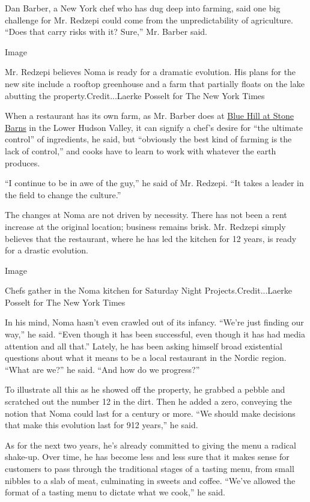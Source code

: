 Dan Barber, a New York chef who has dug deep into farming, said one big
challenge for Mr. Redzepi could come from the unpredictability of
agriculture. ``Does that carry risks with it? Sure,'' Mr. Barber said.

Image

Mr. Redzepi believes Noma is ready for a dramatic evolution. His plans
for the new site include a rooftop greenhouse and a farm that partially
floats on the lake abutting the property.Credit...Laerke Posselt for The
New York Times

When a restaurant has its own farm, as Mr. Barber does at
\href{https://www.bluehillfarm.com/dine/stone-barns}{Blue Hill at Stone
Barns} in the Lower Hudson Valley, it can signify a chef's desire for
``the ultimate control'' of ingredients, he said, but ``obviously the
best kind of farming is the lack of control,'' and cooks have to learn
to work with whatever the earth produces.

``I continue to be in awe of the guy,'' he said of Mr. Redzepi. ``It
takes a leader in the field to change the culture.''

The changes at Noma are not driven by necessity. There has not been a
rent increase at the original location; business remains brisk. Mr.
Redzepi simply believes that the restaurant, where he has led the
kitchen for 12 years, is ready for a drastic evolution.

Image

Chefs gather in the Noma kitchen for Saturday Night
Projects.Credit...Laerke Posselt for The New York Times

In his mind, Noma hasn't even crawled out of its infancy. ``We're just
finding our way,'' he said. ``Even though it has been successful, even
though it has had media attention and all that.'' Lately, he has been
asking himself broad existential questions about what it means to be a
local restaurant in the Nordic region. ``What are we?'' he said. ``And
how do we progress?''

To illustrate all this as he showed off the property, he grabbed a
pebble and scratched out the number 12 in the dirt. Then he added a
zero, conveying the notion that Noma could last for a century or more.
``We should make decisions that make this evolution last for 912
years,'' he said.

As for the next two years, he's already committed to giving the menu a
radical shake-up. Over time, he has become less and less sure that it
makes sense for customers to pass through the traditional stages of a
tasting menu, from small nibbles to a slab of meat, culminating in
sweets and coffee. ``We've allowed the format of a tasting menu to
dictate what we cook,'' he said.

